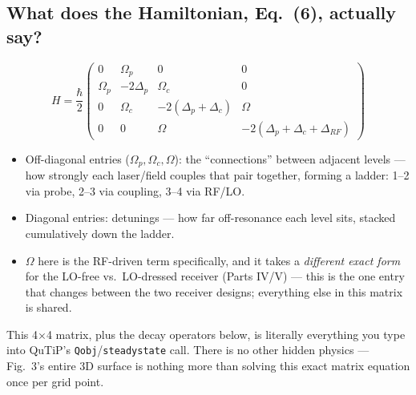 \documentclass[11pt]{article}
\begin{document}
\subsection*{What does the Hamiltonian, Eq.~(6), actually say?}
\[
H = \frac{\hbar}{2}
\begin{pmatrix}
0 & \Omega_p & 0 & 0\\
\Omega_p & -2\Delta_p & \Omega_c & 0\\
0 & \Omega_c & -2(\Delta_p+\Delta_c) & \Omega\\
0 & 0 & \Omega & -2(\Delta_p+\Delta_c+\Delta_{RF})
\end{pmatrix}
\]
\begin{itemize}
\item Off-diagonal entries ($\Omega_p,\Omega_c,\Omega$): the ``connections'' between adjacent levels --- how strongly each laser/field couples that pair together, forming a ladder: 1--2 via probe, 2--3 via coupling, 3--4 via RF/LO.
\item Diagonal entries: detunings --- how far off-resonance each level sits, stacked cumulatively down the ladder.
\item $\Omega$ here is the RF-driven term specifically, and it takes a \emph{different exact form} for the LO-free vs.\ LO-dressed receiver (Parts IV/V) --- this is the one entry that changes between the two receiver designs; everything else in this matrix is shared.
\end{itemize}
\begin{simuse}
This 4$\times$4 matrix, plus the decay operators below, is literally everything you type into QuTiP's \texttt{Qobj}/\texttt{steadystate} call. There is no other hidden physics --- Fig.~3's entire 3D surface is nothing more than solving this exact matrix equation once per grid point.
\end{simuse}
\end{document}
